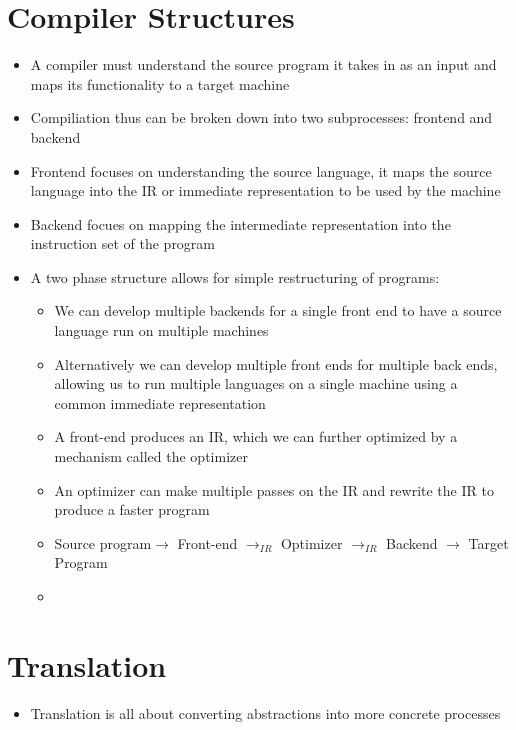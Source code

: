 \documentclass[20pt]{article}
\begin{document}
\section*{Compiler Structures}
	\begin{itemize}
		\item{A compiler must understand the source program it takes in as an input and maps its functionality to a target machine}
  		\item{Compiliation thus can be broken down into two subprocesses: frontend and backend}
   	    \item{Frontend focuses on understanding the source language, it maps the source language into the IR or immediate representation to be used by the machine}
        \item{Backend focues on mapping the intermediate representation into the instruction set of the program}
    	\item A two phase structure allows for simple restructuring of programs:
     	\begin{itemize} 
			\item We can develop multiple backends for a single front end to have a source language run on multiple machines
   			\item Alternatively we can develop multiple front ends for multiple back ends, allowing us to run multiple languages on a single machine using a common immediate representation
    		\item A front-end produces an IR, which we can further optimized by a mechanism called the optimizer
      		\item An optimizer can make multiple passes on the IR and rewrite the IR to produce a faster program
        	\item Source program$\rightarrow$ Front-end $\rightarrow_{IR}$ Optimizer $\rightarrow_{IR}$ Backend $\rightarrow$ Target Program  
			\item 
		\end{itemize}
    \end{itemize}
\section*{Translation}
	\begin{itemize}
		\item Translation is all about converting abstractions into more concrete processes 
	\end{itemize}
\end{document}
